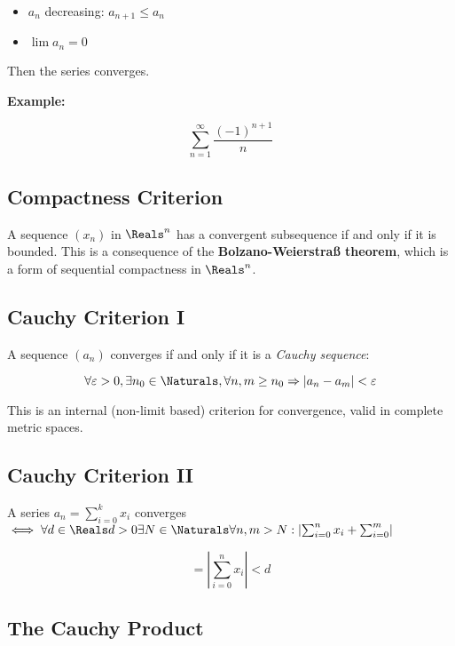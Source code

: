 \begin{itemize}

  \item \(a_n\) decreasing: \(a_{n+1} \le a_n\)

  \item \(\lim a_n = 0\)

\end{itemize}

Then the series converges.
\vspace{\baselineskip}

\textbf{Example:}
\vspace{\baselineskip}

\[
    \sum_{n=1}^\infty \frac{{(-1)}^{n+1}}{n}
\]

\subsection{Compactness Criterion}

A sequence \((x_n)\) in \(\Reals^n\) has a convergent subsequence if and only if it is bounded. 
This is a consequence of the \textbf{Bolzano-Weierstraß theorem}, which is a form of sequential 
compactness in \(\Reals^n\).

\subsection{Cauchy Criterion I}

A sequence \((a_n)\) converges if and only if it is a \emph{Cauchy sequence}:

\[
    \forall \varepsilon > 0, \exists n_0 \in \Naturals, \forall n, m \ge n_0 \Rightarrow |a_n - a_m| < \varepsilon
\]

This is an internal (non-limit based) criterion for convergence, valid in complete metric spaces.

\subsection{Cauchy Criterion II}

A series \(a_n = \sum_{i = 0}^{k}x_i\) converges \(\iff \forall d \in \Reals d > 0 
\exists N \in \Naturals \forall n,m > N: \left| \sum_{i = 0}^{n}x_i + \sum_{i=0}^{m}\right|\)

\[
    = \left|\sum_{i = 0}^{n}x_i\right| < d
\]


\subsection{The Cauchy Product}

